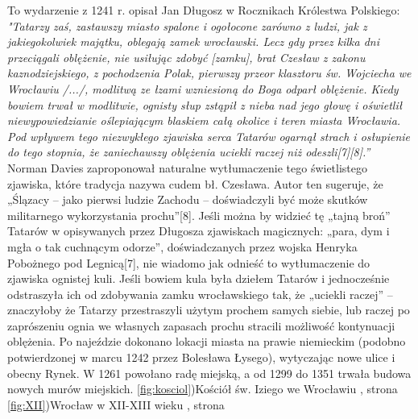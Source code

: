 \documentclass{article}
\begin{document}
\vspace{3mm} %
\newline To wydarzenie z 1241 r. opisał Jan Długosz w Rocznikach Królestwa Polskiego:
\vspace{3mm} %
\newline\textit{"Tatarzy zaś, zastawszy miasto spalone i ogołocone zarówno z ludzi, jak z jakiegokolwiek majątku, oblegają zamek wrocławski. Lecz gdy przez kilka dni przeciągali oblężenie, nie usiłując zdobyć [zamku], brat Czesław z zakonu kaznodziejskiego, z pochodzenia Polak, pierwszy przeor klasztoru św. Wojciecha we Wrocławiu /.../, modlitwą ze łzami wzniesioną do Boga odparł oblężenie. Kiedy bowiem trwał w modlitwie, ognisty słup zstąpił z nieba nad jego głowę i oświetlił niewypowiedzianie oślepiającym blaskiem całą okolice i teren miasta Wrocławia. Pod wpływem tego niezwykłego zjawiska serca Tatarów ogarnął strach i osłupienie do tego stopnia, że zaniechawszy oblężenia uciekli raczej niż odeszli[7][8].”}
\vspace{3mm} %
\newline Norman Davies zaproponował naturalne wytłumaczenie tego świetlistego zjawiska, które tradycja nazywa cudem bł. Czesława. Autor ten sugeruje, że „Ślązacy – jako pierwsi ludzie Zachodu – doświadczyli być może skutków militarnego wykorzystania prochu”[8]. Jeśli można by widzieć tę „tajną broń” Tatarów w opisywanych przez Długosza zjawiskach magicznych: „para, dym i mgła o tak cuchnącym odorze”, doświadczanych przez wojska Henryka Pobożnego pod Legnicą[7], nie wiadomo jak odnieść to wytłumaczenie do zjawiska ognistej kuli. Jeśli bowiem kula była dziełem Tatarów i jednocześnie odstraszyła ich od zdobywania zamku wrocławskiego tak, że „uciekli raczej” – znaczyłoby że Tatarzy przestraszyli użytym prochem samych siebie, lub raczej po zaprószeniu ognia we własnych zapasach prochu stracili możliwość kontynuacji oblężenia.
\vspace{3mm} %
\newline Po najeździe dokonano lokacji miasta na prawie niemieckim (podobno potwierdzonej w marcu 1242 przez Bolesława Łysego), wytyczając nowe ulice i obecny Rynek. W 1261 powołano radę miejską, a od 1299 do 1351 trwała budowa nowych murów miejskich.
\newline \ref{fig:kosciol})Kościół św. Iziego we Wrocławiu , strona \pageref{fig:kosciol} 
\newline \ref{fig:XII})Wrocław w XII-XIII wieku , strona \pageref{fig:XII}
\end{document}
